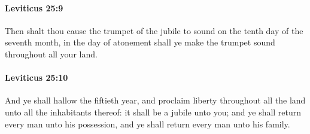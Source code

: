 		\paragraph{Leviticus 25:9} %
			\label{LEVITICUS-25-9}

			Then shalt thou cause the trumpet of the jubile to sound on the tenth day of the seventh month, in the day of atonement shall ye make the trumpet sound throughout all your land.


		\paragraph{Leviticus 25:10} %
			\label{LEVITICUS-25-10}

			And ye shall hallow the fiftieth year, and proclaim liberty throughout all the land unto all the inhabitants thereof: it shall be a jubile unto you; and ye shall return every man unto his possession, and ye shall return every man unto his family.

